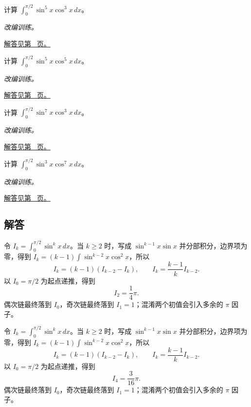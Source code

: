 \documentclass[12pt,fontset=fandol]{ctexart}
\begin{document}
\begin{example}[两种奇次幂的混合积分]\label{ex:c16q21}
计算 $\int_0^{\pi/2}\sin^{5}x\cos^{3}x\,dx$。
\par\textit{改编训练。}\par\hyperref[ans:c16q21]{解答见第~\pageref{ans:c16q21} 页。}
\end{example}
\begin{example}[两种奇次幂的混合积分]\label{ex:c16q22}
计算 $\int_0^{\pi/2}\sin^{5}x\cos^{5}x\,dx$。
\par\textit{改编训练。}\par\hyperref[ans:c16q22]{解答见第~\pageref{ans:c16q22} 页。}
\end{example}
\begin{example}[两种奇次幂的混合积分]\label{ex:c16q23}
计算 $\int_0^{\pi/2}\sin^{7}x\cos^{3}x\,dx$。
\par\textit{改编训练。}\par\hyperref[ans:c16q23]{解答见第~\pageref{ans:c16q23} 页。}
\end{example}
\begin{example}[两种奇次幂的混合积分]\label{ex:c16q24}
计算 $\int_0^{\pi/2}\sin^{3}x\cos^{7}x\,dx$。
\par\textit{改编训练。}\par\hyperref[ans:c16q24]{解答见第~\pageref{ans:c16q24} 页。}
\end{example}
\subsection{解答}
\begin{solve}\label{ans:c16q1}
令 $I_k=\int_0^{\pi/2}\sin^kx\,dx$。当 $k\ge2$ 时，写成 $\sin^{k-1}x\sin x$ 并分部积分，边界项为零，得到 $I_k=(k-1)\int\sin^{k-2}x\cos^2x$，所以
\[
I_k=(k-1)(I_{k-2}-I_k),\qquad I_k=\frac{k-1}{k}I_{k-2}.
\]
以 $I_0=\pi/2$ 为起点递推，得到
\[
I_{2}=\frac{1}{4}\pi.
\]
偶次链最终落到 $I_0$，奇次链最终落到 $I_1=1$；混淆两个初值会引入多余的 $\pi$ 因子。
\end{solve}

\begin{solve}\label{ans:c16q2}
令 $I_k=\int_0^{\pi/2}\sin^kx\,dx$。当 $k\ge2$ 时，写成 $\sin^{k-1}x\sin x$ 并分部积分，边界项为零，得到 $I_k=(k-1)\int\sin^{k-2}x\cos^2x$，所以
\[
I_k=(k-1)(I_{k-2}-I_k),\qquad I_k=\frac{k-1}{k}I_{k-2}.
\]
以 $I_0=\pi/2$ 为起点递推，得到
\[
I_{4}=\frac{3}{16}\pi.
\]
偶次链最终落到 $I_0$，奇次链最终落到 $I_1=1$；混淆两个初值会引入多余的 $\pi$ 因子。
\end{solve}
\end{document}
